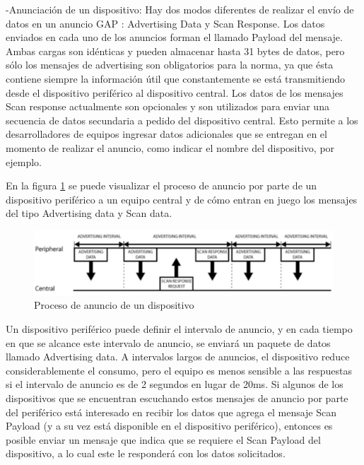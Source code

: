 	-Anunciación de un dispositivo: Hay dos modos diferentes de realizar el envío de datos en un anuncio GAP : Advertising Data y Scan Response. Los datos enviados en cada uno de los anuncios forman el llamado Payload del mensaje. Ambas cargas son idénticas y pueden almacenar hasta 31 bytes de datos, pero sólo los mensajes de
	advertising son obligatorios para la norma, ya que ésta contiene siempre la información útil que constantemente se está transmitiendo desde el dispositivo periférico al dispositivo central. Los datos de los mensajes Scan response actualmente son opcionales y son utilizados para enviar una secuencia de datos secundaria a pedido del dispositivo central. Esto permite a los desarrolladores de equipos ingresar datos adicionales que se entregan en el momento de realizar el anuncio, como indicar el nombre del dispositivo, por ejemplo.

En la figura \ref{advertising} se puede visualizar el proceso de anuncio por parte de un dispositivo periférico a un equipo central y de cómo entran en juego los mensajes del tipo Advertising data y Scan data. 

\begin{figure}[H]
	\centering
	\includegraphics[scale=0.4]{figuras/rn4020/advertising.png}
	\caption{Proceso de anuncio de un dispositivo \cite{RN4020}}
	\label{advertising}
\end{figure}

Un dispositivo periférico puede definir el intervalo de anuncio, y en cada tiempo en que se alcance este intervalo de anuncio, se enviará un paquete de datos llamado Advertising data. A intervalos largos de anuncios, el dispositivo reduce considerablemente el consumo, pero el equipo es menos sensible a las respuestas si el intervalo de anuncio es de 2 segundos en lugar de 20ms. Si algunos de los dispositivos que se encuentran escuchando estos mensajes de anuncio por parte del periférico está interesado en recibir los datos que agrega el mensaje Scan Payload (y a su vez está disponible en el dispositivo periférico), entonces es posible enviar un mensaje que indica que se requiere el Scan Payload del dispositivo, a lo cual este le responderá con los datos solicitados.


